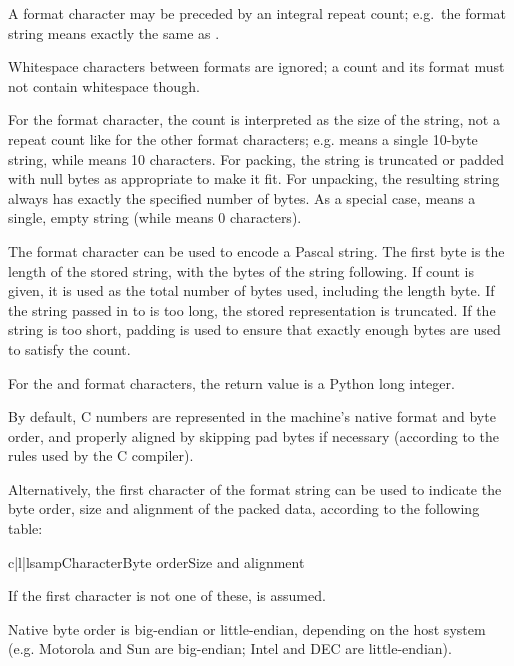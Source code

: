 A format character may be preceded by an integral repeat count; e.g.\
the format string  means exactly the same as .

Whitespace characters between formats are ignored; a count and its
format must not contain whitespace though.

For the  format character, the count is interpreted as the
size of the string, not a repeat count like for the other format
characters; e.g. \code{'10s'} means a single 10-byte string, while
\code{'10c'} means 10 characters.  For packing, the string is
truncated or padded with null bytes as appropriate to make it fit.
For unpacking, the resulting string always has exactly the specified
number of bytes.  As a special case, \code{'0s'} means a single, empty
string (while \code{'0c'} means 0 characters).

The  format character can be used to encode a Pascal
string.  The first byte is the length of the stored string, with the
bytes of the string following.  If count is given, it is used as the
total number of bytes used, including the length byte.  If the string
passed in to \function{pack()} is too long, the stored representation
is truncated.  If the string is too short, padding is used to ensure
that exactly enough bytes are used to satisfy the count.

For the  and  format characters, the return
value is a Python long integer.

By default, C numbers are represented in the machine's native format
and byte order, and properly aligned by skipping pad bytes if
necessary (according to the rules used by the C compiler).

Alternatively, the first character of the format string can be used to
indicate the byte order, size and alignment of the packed data,
according to the following table:

\begin{tableiii}{c|l|l}{samp}{Character}{Byte order}{Size and alignment}
  \lineiii{@}{native}{native}
\end{tableiii}

If the first character is not one of these,  is assumed.

Native byte order is big-endian or little-endian, depending on the
host system (e.g. Motorola and Sun are big-endian; Intel and DEC are
little-endian).

